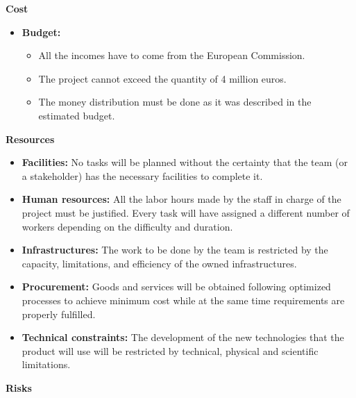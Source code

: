 \textbf{Cost}

\begin{itemize}
	
	\item \textbf{Budget:}
	
	\begin{itemize}
		
		\item All the incomes have to come from the European Commission.
		
		\item The project cannot exceed the quantity of 4 million euros.
		
		\item The money distribution must be done as it was described in the estimated budget.
		
	\end{itemize}

\end{itemize}

\textbf{Resources}

\begin{itemize}
	
	\item \textbf{Facilities:} No tasks will be planned without the certainty that the team (or a stakeholder) has the necessary facilities to complete it.
	
	\item \textbf{Human resources:} All the labor hours made by the staff in charge of the project must be justified. Every task will have assigned a different number of workers depending on the difficulty and duration.
	
	\item \textbf{Infrastructures:} The work to be done by the team is restricted by the capacity, limitations, and efficiency of the owned infrastructures.
	
	\item \textbf{Procurement:} Goods and services will be obtained following optimized processes to achieve minimum cost while at the same time requirements are properly fulfilled.
	
	\item \textbf{Technical constraints:} The development of the new technologies that the product will use will be restricted by technical, physical and scientific limitations.
	
	
\end{itemize}

\textbf{Risks}

